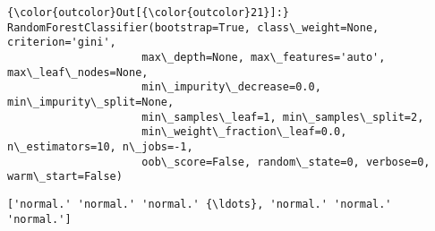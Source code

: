 \documentclass[11pt]{article}
\begin{document}
\begin{Verbatim}[commandchars=\\\{\}]
{\color{outcolor}Out[{\color{outcolor}21}]:} RandomForestClassifier(bootstrap=True, class\_weight=None, criterion='gini',
                     max\_depth=None, max\_features='auto', max\_leaf\_nodes=None,
                     min\_impurity\_decrease=0.0, min\_impurity\_split=None,
                     min\_samples\_leaf=1, min\_samples\_split=2,
                     min\_weight\_fraction\_leaf=0.0, n\_estimators=10, n\_jobs=-1,
                     oob\_score=False, random\_state=0, verbose=0, warm\_start=False)
\end{Verbatim}
            
    \begin{Verbatim}[commandchars=\\\{\}]
['normal.' 'normal.' 'normal.' {\ldots}, 'normal.' 'normal.' 'normal.']

    \end{Verbatim}
\end{document}
